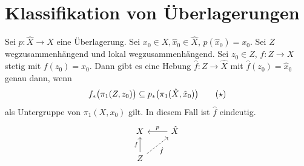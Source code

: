 \newpage
\section{Klassifikation von Überlagerungen} %
\label{sec:klassifikation_von_uberlagerungen}

\begin{satz}[{name={Hebungssatz}},label=satz:hebungssatz]
	Sei $p \colon \hat{X} \to X$ eine Überlagerung. 
	Sei $x_0 \in X, \hat{x}_0 \in \hat{X}$, $p(\hat{x}_0)= x_0$. 
	Sei $Z$ wegzusammenhängend und lokal wegzusammenhängend. 
	Sei $z_0 \in Z$, $f \colon Z \to X$ stetig mit $f(z_0)= x_0$. 
	Dann gibt es eine Hebung $\hat{f} \colon Z \to \hat{X}$ mit $\hat{f} (z_0) = \hat{x}_0$ genau dann, wenn
	\begin{equation}
		f_*\enbrace[\big]{\pi_1 (Z, z_0)} \subseteq  p_* \enbrace[\big]{\pi_1(\hat{X}, \hat{x}_0)} \tag{$\star$}\label{eq:hebungssatz}
	\end{equation}
	als Untergruppe von $\pi_1(X,x_0)$ gilt. 
	In diesem Fall ist $\hat{f}$ eindeutig.
	\[
		\begin{tikzcd}
			X & \hat{X} \lar[swap]{p} \\
			Z \uar{f}  \urar[dashed, swap]{\hat{f}}&
		\end{tikzcd}
	\]
\end{satz}
